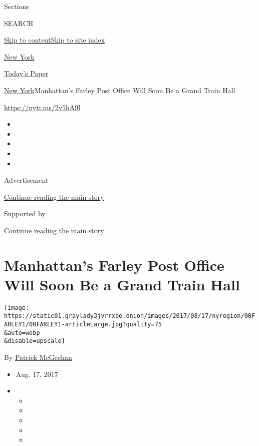 Sections

SEARCH

\protect\hyperlink{site-content}{Skip to
content}\protect\hyperlink{site-index}{Skip to site index}

\href{https://www.nytimes3xbfgragh.onion/section/nyregion}{New York}

\href{https://myaccount.nytimes3xbfgragh.onion/auth/login?response_type=cookie\&client_id=vi}{}

\href{https://www.nytimes3xbfgragh.onion/section/todayspaper}{Today's
Paper}

\href{/section/nyregion}{New York}\textbar{}Manhattan's Farley Post
Office Will Soon Be a Grand Train Hall

\url{https://nyti.ms/2v5hA9l}

\begin{itemize}
\item
\item
\item
\item
\item
\end{itemize}

Advertisement

\protect\hyperlink{after-top}{Continue reading the main story}

Supported by

\protect\hyperlink{after-sponsor}{Continue reading the main story}

\hypertarget{manhattans-farley-post-office-will-soon-be-a-grand-train-hall}{%
\section{Manhattan's Farley Post Office Will Soon Be a Grand Train
Hall}\label{manhattans-farley-post-office-will-soon-be-a-grand-train-hall}}

\texttt{[image: https://static01.graylady3jvrrxbe.onion/images/2017/08/17/nyregion/00FARLEY1/00FARLEY1-articleLarge.jpg?quality=75\\\&auto=webp\\\&disable=upscale]}

By \href{http://www.nytimes3xbfgragh.onion/by/patrick-mcgeehan}{Patrick
McGeehan}

\begin{itemize}
\item
  Aug. 17, 2017
\item
  \begin{itemize}
  \item
  \item
  \item
  \item
  \item
  \end{itemize}
\end{itemize}

